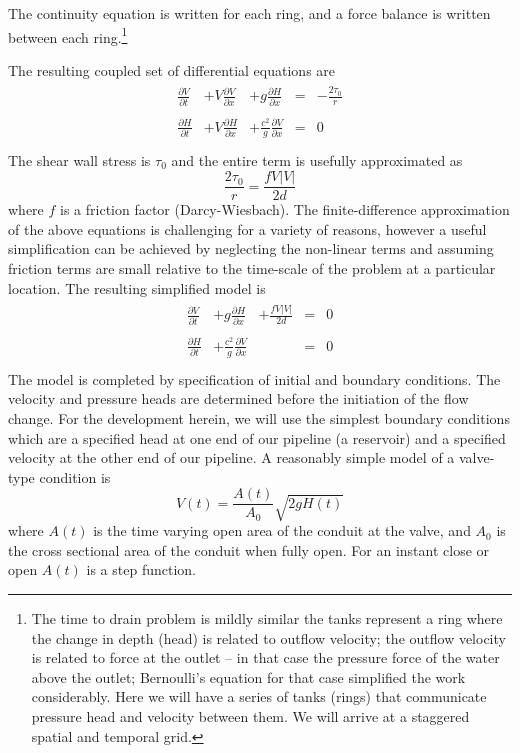 The continuity equation is written for each ring, and a force balance is written between each ring.\footnote{The time to drain problem is mildly similar the tanks represent a ring where the change in depth (head) is related to outflow velocity; the outflow velocity is related to force at the outlet -- in that case the pressure force of the water above the outlet; Bernoulli's equation for that case simplified the work considerably.  Here we will have a series of tanks (rings) that communicate pressure head and velocity between them.  We will arrive at a staggered spatial and temporal grid.}

The resulting coupled set of differential equations are
\begin{gather}
\begin{matrix}
\frac{\partial V}{\partial t} &+ V\frac{\partial V}{\partial x} &+ g\frac{\partial H}{\partial x} & = &- \frac{2 \tau_0}{r} \\
\\
\frac{\partial H}{\partial t} &+ V\frac{\partial H}{\partial x} &+ \frac{c^2}{g}\frac{\partial V}{\partial x} & = & 0\\
\end{matrix}
\end{gather}
The shear wall stress is $\tau_0$ and the entire term is usefully approximated as
\begin{equation}
\frac{2 \tau_0}{r} = \frac{fV|V|}{2d}
\end{equation}
where $f$ is a friction factor (Darcy-Wiesbach).
The finite-difference approximation of the above equations is challenging for a variety of reasons, however a useful simplification can be achieved by neglecting the non-linear terms and assuming friction terms are small relative to the time-scale of the problem at a particular location.  The resulting simplified model is
\begin{gather}
\begin{matrix}
\frac{\partial V}{\partial t} & + g\frac{\partial H}{\partial x} &+ \frac{fV|V|}{2d}& = & 0 \\
\\
\frac{\partial H}{\partial t} & + \frac{c^2}{g}\frac{\partial V}{\partial x}& & = & 0\\
\end{matrix}
\end{gather}
The model is completed by specification of initial and boundary conditions.
The velocity and pressure heads are determined before the initiation of the flow change.  
For the development herein, we will use the simplest boundary conditions which are a specified head at one end of our pipeline (a reservoir) and a specified velocity at the other end of our pipeline.
A reasonably simple model of a valve-type condition is
\begin{equation}
V(t) = \frac{A(t)}{A_0} \sqrt{2gH(t)}
\end{equation}
where $A(t)$ is the time varying open area of the conduit at the valve, and $A_0$ is the cross sectional area of the conduit when fully open. 
For an instant close or open $A(t)$ is a step function.

